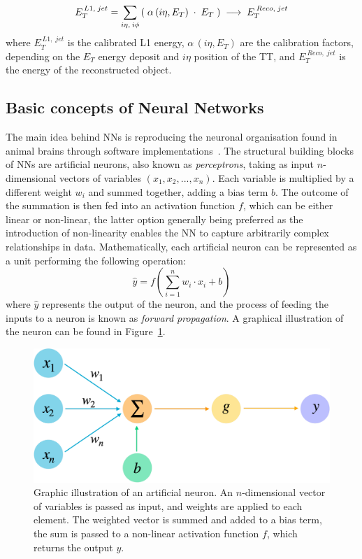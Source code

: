 \begin{equation}
    E_T^{\,L1,\;jet} = \sum_{i\eta,\:i\phi}\left(\;\alpha\,(i\eta,E_{T})\;\cdot\;E_{T}\;\right) 
    \;\longrightarrow\;
    E_T^{\:Reco,\;jet}
\label{{eq:Training}}
\end{equation}
where $E_T^{\,L1,\;jet}$ is the calibrated L1 energy, $\alpha\,(i\eta,E_{T})$ are the calibration factors, depending on the $E_T$ energy deposit and $i\eta$ position of the TT, and $E_T^{\:Reco,\;jet}$ is the energy of the reconstructed object.

\subsection{Basic concepts of Neural Networks}

The main idea behind NNs is reproducing the neuronal organisation found in animal brains through software implementations~\cite{1672070}.
The structural building blocks of NNs are artificial neurons, also known as \textit{perceptrons}, taking as input $n$-dimensional vectors of variables $(x_1,x_2,...,x_n)$. Each variable is multiplied by a different weight $w_i$ and summed together, adding a bias term $b$.
The outcome of the summation is then fed into an activation function $f$, which can be either linear or non-linear, the latter option generally being preferred as the introduction of non-linearity enables the NN to capture arbitrarily complex relationships in data.
Mathematically, each artificial neuron can be represented as a unit performing the following operation:
\begin{equation}
    \hat{y}=f\left( \sum_{i=1}^{n}w_i \cdot x_i + b \right)
\end{equation}
where $\hat{y}$ represents the output of the neuron, and the process of feeding the inputs to a neuron is known as \textit{forward propagation}. A graphical illustration of the neuron can be found in Figure~\ref{fig:Perceptron}.

\begin{figure}
    \centering
    \includegraphics[width=0.6\linewidth]{Figures/L1TP/Perceptron.pdf}
    \caption{Graphic illustration of an artificial neuron. An $n$-dimensional vector of variables is passed as input, and weights are applied to each element. The weighted vector is summed and added to a bias term, the sum is passed to a non-linear activation function $f$, which returns the output $y$.}
    \label{fig:Perceptron}
\end{figure}

